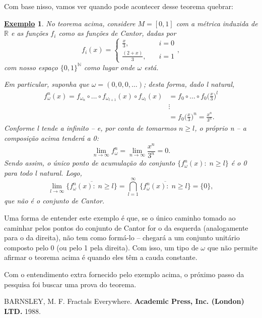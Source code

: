 \documentclass[12pt]{article}
\newtheorem{example}{\underline{Exemplo}}
\theoremstyle{definition}
\begin{document}
Com base nisso, vamos ver quando pode acontecer desse teorema quebrar:
\begin{example}
	No teorema acima, considere \(M=[0,1]\) com a métrica induzida de \(\mathbb{R}\) e as funções \(f_{i}\) como as funções de Cantor, dadas por
	\[
		f_{i}(x) = \left\{\begin{array}{ll}
			\frac{x}{3},     & \quad i=0 \\
			\frac{(2+x)}{3}, & \quad i=1
		\end{array}\right.,
	\]
	com nosso espaço \(\{0,1\}^{\mathbb{N}}\) como lugar onde \(\omega \) está.

	Em particular, suponha que \(\omega =(0,0,0,\dotsc )\); desta forma, dado l natural,
	\begin{align*}
		f_{\omega }^{n}(x)=f_{\omega_{n}}\circ \dotsc \circ f_{\omega_{l+1}}(x)\circ f_{\omega_{l}}(x) & =f_{0}\circ \dotsc \circ f_{0}\biggl(\frac{x}{3}\biggr)^{l} \\
		                                                                                               & \vdots                                                      \\
		                                                                                               & =f_{0}\biggl(\frac{x}{3}\biggr)^{n} = \frac{x^{n}}{3^{n}}.
	\end{align*}
	Conforme l tende a infinito -- e, por conta de tomarmos \(n\geq l\), o próprio n -- a composição acima tenderá a 0:
	\[
		\lim_{n\to \infty}f_{\omega}^{n} = \lim_{n\to \infty}\frac{x^{n}}{3^{n}}= 0.
	\]
	Sendo assim, o único ponto de acumulação do conjunto \(\{f_{\omega }^{n}(x):\; n\geq l\}\) é o 0 para todo l natural. Logo,
	\[
		\lim_{l\to \infty}\overline{\{f_{\omega }^{n}(x):\; n\geq l\}}=\bigcap_{l=1}^{\infty}\overline{\{f_{\omega }^{n}(x):\; n\geq l\}}=\{0\},
	\]
	que não é o conjunto de Cantor.
\end{example}
Uma forma de entender este exemplo é que, se o único caminho tomado ao caminhar pelos pontos do conjunto de Cantor for o da esquerda (analogamente para o da direita), não tem como formá-lo -- chegará a um conjunto unitário composto pelo 0 (ou pelo 1 pela direita). Com isso, um tipo de \(\omega \) que não permite afirmar o teorema acima é quando eles têm a cauda constante.

Com o entendimento extra fornecido pelo exemplo acima, o próximo passo da pesquisa foi buscar uma prova do teorema.

\begin{thebibliography}{99}
	 BARNSLEY, M. F. Fractals Everywhere. \textbf{Academic Press, Inc. (London) LTD.} 1988.
\end{thebibliography}
\end{document}
